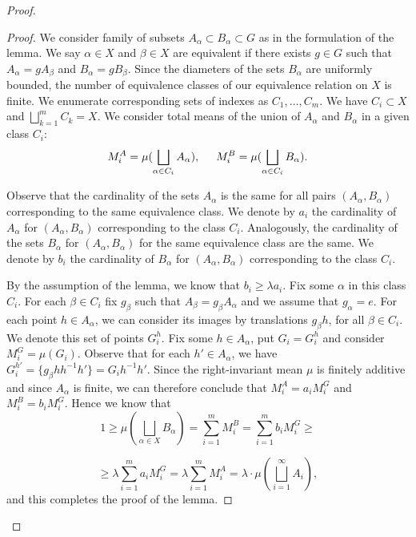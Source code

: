 \documentclass{amsart}
\numberwithin{figure}{section}
\theoremstyle{plain}
\theoremstyle{definition}
\begin{document}
\begin{proof}
\begin{proof}
We consider  family of subsets $A_{\alpha} \subset B_{\alpha} \subset G$ as in the formulation of the lemma.
We say  $\alpha \in X$ and $\beta \in X$ are equivalent if there exists
$g\in G$ such that $A_{\alpha}= gA_{\beta}$ and $B_{\alpha}=g B_{\beta}$.
Since the diameters of the sets $B_{\alpha}$ are uniformly bounded, the number of equivalence classes of our equivalence relation on $X$ is finite.
We enumerate  corresponding sets of indexes 
as $C_1,\dots, C_m$. We have $C_i \subset X$ and $\bigsqcup_{k = 1}^{m}C_k = X$.
We consider total means  of the union of $A_{\alpha}$ and $B_{\alpha}$ in a given class $C_i$:
$$
M^A_i = \mu (\bigsqcup_{ \alpha \in C_i} A_{\alpha}), \hspace{0.5cm}
M^B_i = \mu (\bigsqcup_{\alpha \in C_i} B_{\alpha}).
$$
 
Observe that the cardinality of the sets $A_{\alpha}$ is the same for all
 pairs $(A_{\alpha}, B_{\alpha})$ corresponding to the same equivalence class. We 
denote 
by $a_i$ the cardinality of $A_\alpha$ for $(A_{\alpha}, B_{\alpha})$ corresponding to the class $C_i$. Analogously, the cardinality of the sets
$B_{\alpha}$ for $(A_\alpha, B_{\alpha})$ for the same equivalence class are the same.
We denote  by
$b_i$ the cardinality of $B_{\alpha}$ for $(A_\alpha, B_{\alpha})$
corresponding to the class $C_i$.

 By the assumption of the lemma, we know that $b_i \geqslant \lambda a_i$.
 Fix some $\alpha$ in this class $C_i$.  For each $\beta \in C_i$ fix $g_\beta$ such that $A_{\beta} = g_\beta A_\alpha$ and we assume that $g_\alpha=e$.
For each point $h \in A_\alpha$, we can consider its images by translations
 $g_{\beta} h$, for all $\beta \in C_i$.
We denote this set of points $G_i^h$.
Fix some $h \in A_\alpha$, put $G_i= G_i^h$ and consider $M_i^G = \mu(G_i)$.
Observe that for each $h' \in A_{\alpha}$, we have 
$G_i^{h'} = 
\{g_{\beta} h h^{-1}h'\} = G_i h^{-1}h'$.
Since the right-invariant mean $\mu$ is finitely additive and since $A_\alpha$ is finite, we can 
therefore conclude that  $M_i^A = a_i M_i^G$ and $M_i^B = b_i M_i^G$.
 Hence we know that 
$$
1 \geqslant \mu (\bigsqcup_{\alpha \in X}B_{\alpha}) =
\sum_{i = 1}^{m} M^B_i = \sum_{i = 1}^{m} b_i M^G_i \geqslant
$$
 
$$
\geqslant \lambda \sum_{i = 1}^{m} a_i M^G_i = \lambda \sum_{i = 1}^{m} M^A_i = \lambda \cdot \mu (\bigsqcup_{i = 1}^{\infty} A_i),
$$
 and this completes the proof of the lemma.
\end{proof}



\end{proof}
\end{document}
